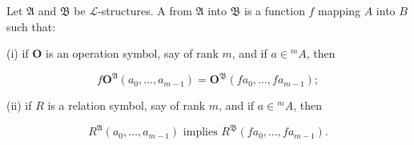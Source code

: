 Let $\mathfrak{A}$ and $\mathfrak{B}$ be $\mathcal{L}$-structures. A  from $\mathfrak{A}$ into $\mathfrak{B}$ is a function $f$ mapping $A$ into $B$ such that:

(i) if $\mathbf{O}$ is an operation symbol, say of rank $m$, and if $a \in {}^mA$, then

$$f\mathbf{O}^{\mathfrak{A}}(a_0, \ldots, a_{m-1}) = \mathbf{O}^{\mathfrak{B}}(f a_0, \ldots, f a_{m-1});$$

(ii) if $R$ is a relation symbol, say of rank $m$, and if $a \in {}^mA$, then

$$R^{\mathfrak{A}}(a_0, \ldots, a_{m-1}) \text{ implies } R^{\mathfrak{B}}(f a_0, \ldots, f a_{m-1}).$$

